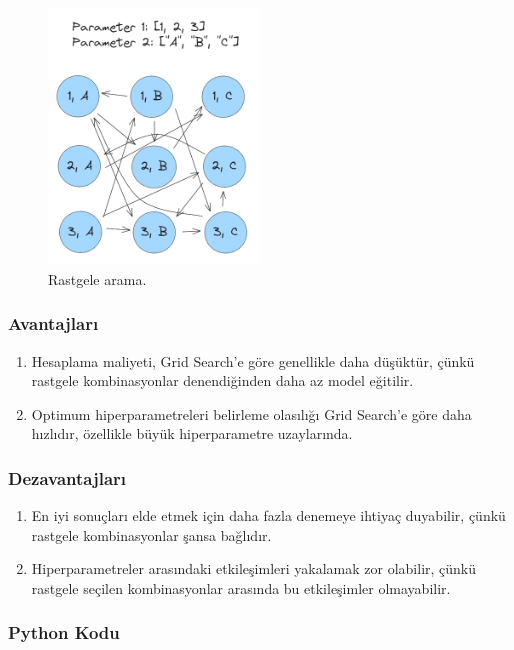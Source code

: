 \begin{figure}[h]
    \centering
    \includegraphics[width=0.5\textwidth]{images/Random_Search.png}
    \caption{Rastgele arama.}
    \label{fig:enter-label}
\end{figure}

\subsubsection{Avantajları}
\begin{enumerate}
    \item Hesaplama maliyeti, Grid Search'e göre genellikle daha düşüktür, çünkü rastgele kombinasyonlar denendiğinden daha az model eğitilir.
    \item Optimum hiperparametreleri belirleme olasılığı Grid Search'e göre daha hızlıdır, özellikle büyük hiperparametre uzaylarında.
\end{enumerate}

\subsubsection{Dezavantajları}
\begin{enumerate}
    \item En iyi sonuçları elde etmek için daha fazla denemeye ihtiyaç duyabilir, çünkü rastgele kombinasyonlar şansa bağlıdır.
    \item Hiperparametreler arasındaki etkileşimleri yakalamak zor olabilir, çünkü rastgele seçilen kombinasyonlar arasında bu etkileşimler olmayabilir.
\end{enumerate}

\subsubsection{Python Kodu}

